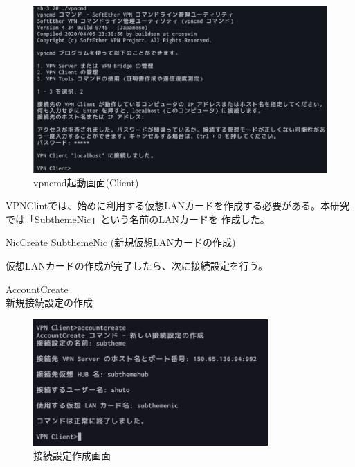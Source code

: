 \documentclass[11pt,a4j,titlepage]{jreport}
\begin{document}
\begin{figure}[tbp]
    \centering
    \includegraphics*[width=1.0\textwidth,page=1]{graphs/clientconfig3.png}
    \caption{vpncmd起動画面(Client)}
    \label{clientconfig}
\end{figure}
VPNClintでは、始めに利用する仮想LANカードを作成する必要がある。本研究では「SubthemeNic」という名前のLANカードを
作成した。
\begin{description}
    \setlength{\parskip}{0.0cm} %
    \setlength{\itemsep}{0.0cm} 
    \item[VPN Client\textgreater] NicCreate SubthemeNic  (新規仮想LANカードの作成)
\end{description}
仮想LANカードの作成が完了したら、次に接続設定を行う。

\begin{description}
    \setlength{\parskip}{0.0cm} %
    \setlength{\itemsep}{0.0cm} 
    \item[VPN Client\textgreater] AccountCreate \\新規接続設定の作成

\end{description}
\fi
\begin{figure}[tbp]
    \centering
    \includegraphics*[width=0.8\textwidth,page=1]{graphs/accountcreate.png}
    \caption{接続設定作成画面}
    \label{accountcreate}
\end{figure}
\end{document}
